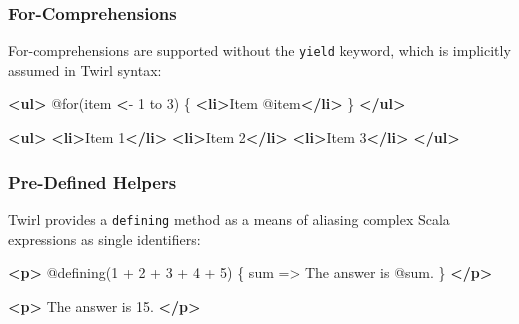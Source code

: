\documentclass[oneside,11pt,a4paper,]{book}
\newenvironment{Shaded}{\begin{snugshade}}{\end{snugshade}}
\newcommand{\KeywordTok}[1]{\textcolor[rgb]{0.13,0.29,0.53}{\textbf{{#1}}}}
\newcommand{\ErrorTok}[1]{\textbf{{#1}}}
\newcommand{\NormalTok}[1]{{#1}}
\begin{document}
\subsubsection{For-Comprehensions}\label{for-comprehensions}

For-comprehensions are supported without the \texttt{yield} keyword,
which is implicitly assumed in Twirl syntax:

\begin{multicols}{2}

\begin{Shaded}
\begin{Highlighting}[]
\KeywordTok{<ul>}
  \NormalTok{@for(item }\ErrorTok{<}\NormalTok{- 1 to 3) \{}
    \KeywordTok{<li>}\NormalTok{Item @item}\KeywordTok{</li>}
  \NormalTok{\}}
\KeywordTok{</ul>}
\end{Highlighting}
\end{Shaded}

\columnbreak

\begin{Shaded}
\begin{Highlighting}[]
\KeywordTok{<ul>}
  \KeywordTok{<li>}\NormalTok{Item 1}\KeywordTok{</li>}
  \KeywordTok{<li>}\NormalTok{Item 2}\KeywordTok{</li>}
  \KeywordTok{<li>}\NormalTok{Item 3}\KeywordTok{</li>}
\KeywordTok{</ul>}
\end{Highlighting}
\end{Shaded}

\end{multicols}

\subsubsection{Pre-Defined Helpers}\label{pre-defined-helpers}

Twirl provides a \texttt{defining} method as a means of aliasing complex
Scala expressions as single identifiers:

\begin{multicols}{2}

\begin{Shaded}
\begin{Highlighting}[]
\KeywordTok{<p>}
  \NormalTok{@defining(1 + 2 + 3 + 4 + 5) \{ sum =>}
    \NormalTok{The answer is @sum.}
  \NormalTok{\}}
\KeywordTok{</p>}
\end{Highlighting}
\end{Shaded}

\columnbreak

\begin{Shaded}
\begin{Highlighting}[]
\KeywordTok{<p>}
  \NormalTok{The answer is 15.}
\KeywordTok{</p>}
\end{Highlighting}
\end{Shaded}

\end{multicols}
\end{document}
